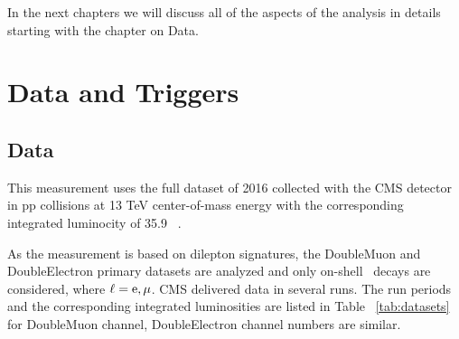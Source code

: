 In the next chapters we will discuss all of the aspects of the analysis in details starting with the chapter on Data. 


\section{Data and Triggers}
\label{sec:data_and_triggers}

\subsection{Data}
This measurement uses the full dataset of 2016 collected with the CMS detector in pp collisions
at 13 TeV center-of-mass energy with the corresponding integrated luminocity of 35.9 ~\fbinv. 

As the measurement is based on dilepton signatures, the DoubleMuon and DoubleElectron primary
datasets are analyzed and only on-shell \Zll~decays are considered, where $\ell=\mathrm{e}, {\mu}$. CMS delivered data in several runs. The run periods and the corresponding integrated luminosities are listed in Table ~\ref{tab:datasets} for DoubleMuon channel, DoubleElectron channel numbers are similar.

\begin{table}[htbp]
\caption{List of used 2016 DoubleMuon data sets.
An uncertainty of $2.5\%$ is  assigned for the 2016 data set luminosity~\cite{lumiUnc}}
\label{tab:datasets}
\begin{center}
\end{center}
\end{table}

